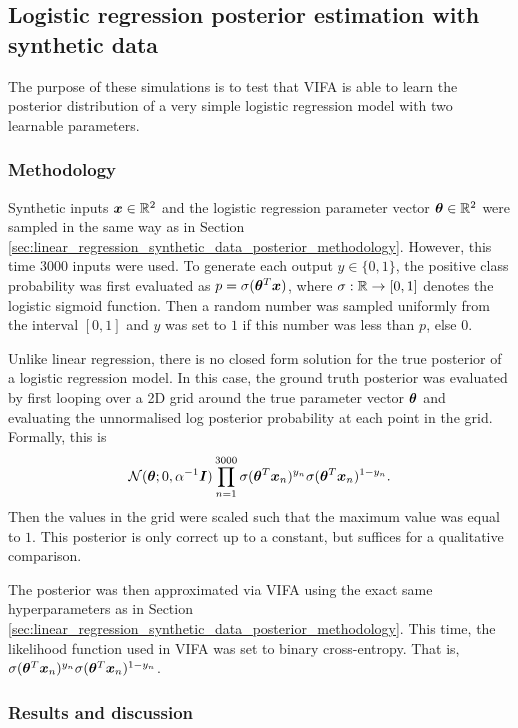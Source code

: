 \documentclass[10pt]{article} %
\begin{document}
\subsection{Logistic regression posterior estimation with synthetic data}

The purpose of these simulations is to test that VIFA is able to learn the posterior distribution of a very simple logistic regression model with two learnable parameters.

\subsubsection{Methodology}

Synthetic inputs ${\bm{x}} \in \mathbb{R}^2$ and the logistic regression parameter vector ${\bm{\theta}} \in \mathbb{R}^2$ were sampled in the same way as in Section \ref{sec:linear_regression_synthetic_data_posterior_methodology}. However, this time $3000$ inputs were used. To generate each output $y \in \{0, 1\}$, the positive class probability was first evaluated as $p = \sigma({\bm{\theta}}^T {\bm{x}})$, where $\sigma: \mathbb{R} \rightarrow [0,1]$ denotes the logistic sigmoid function. Then a random number was sampled uniformly from the interval $[0, 1]$ and $y$ was set to $1$ if this number was less than $p$, else $0$.

Unlike linear regression, there is no closed form solution for the true posterior of a logistic regression model. In this case, the ground truth posterior was evaluated by first looping over a 2D grid around the true parameter vector ${\bm{\theta}}$ and evaluating the unnormalised log posterior probability at each point in the grid. Formally, this is
\begin{equation}
	\mathcal{N} ( {\bm{\theta}} ; 0, \alpha^{-1} {\bm{I}}) \prod_{n=1}^{3000} \sigma({\bm{\theta}}^T {\bm{x}}_n)^{y_n} \sigma({\bm{\theta}}^T {\bm{x}}_n)^{1 - y_n}.
\end{equation}
Then the values in the grid were scaled such that the maximum value was equal to $1$. This posterior is only correct up to a constant, but suffices for a qualitative comparison.

The posterior was then approximated via VIFA using the exact same hyperparameters as in Section \ref{sec:linear_regression_synthetic_data_posterior_methodology}. This time, the likelihood function used in VIFA was set to binary cross-entropy. That is, $\sigma({\bm{\theta}}^T {\bm{x}}_n)^{y_n} \sigma({\bm{\theta}}^T {\bm{x}}_n)^{1 - y_n}$.


\subsubsection{Results and discussion}
\end{document}
